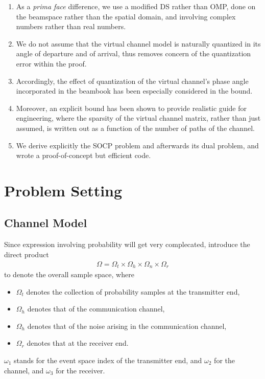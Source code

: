 \documentclass[12pt]{article}
\begin{document}
\begin{enumerate}
\item As a \textit{prima face} difference, we use a modified DS rather than OMP, done on the beamspace rather than the spatial domain, and involving complex numbers rather than real numbers.
\item We do not assume that the virtual channel model is naturally quantized in its angle of departure and of arrival, thus removes concern of the quantization error within the proof.
\item Accordingly, the effect of quantization of the virtual channel's phase angle incorporated in the beambook has been especially considered in the bound.
\item Moreover, an explicit bound has been shown to provide realistic guide for engineering, where the sparsity of the virtual channel matrix, rather than just assumed, is written out as a function of the number of paths of the channel.
\item We derive explicitly the SOCP problem and afterwards its dual problem, and wrote a proof-of-concept but efficient code.
\end{enumerate}

\section{Problem Setting}

\subsection{Channel Model}

Since expression involving probability will get very complecated, introduce the direct product
%
\begin{gather}
\Omega
=\Omega_t \times \Omega_h \times \Omega_n \times \Omega_r
\end{gather}
%
to denote the overall sample space, where
%
\begin{itemize}
\item \(\Omega_t\) denotes the collection of probability samples at the transmitter end,
\item \(\Omega_h\) denotes that of the communication channel,
\item \(\Omega_h\) denotes that of the noise arising in the communication channel,
\item \(\Omega_r\) denotes that at the receiver end.
\end{itemize}
%
\(\omega_1\) stands for the event space index of the transmitter end, and \(\omega_2\) for the channel, and \(\omega_3\) for the receiver.
\end{document}
